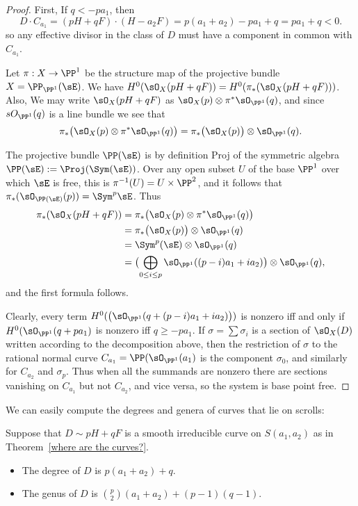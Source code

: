 \begin{proof} First, If $q<-pa_{1}$, then 
$$
D\cdot C_{a_{1}} = (pH+qF) \cdot (H-a_{2}F) = p(a_{1}+a_{2}) -pa_{1}+q = pa_{1}+q < 0.
$$
so any effective divisor in the class of $D$ must have a component in common with $C_{a_{1}}$.

Let $\pi:X\to \PP^{1}$ be the structure map of the projective bundle $X = \PP_{\PP^{1}}(\sE)$.
We have $H^{0}(\sO_{X}(pH+qF)) = H^{0}(\pi_{*}(\sO_{X}(pH+qF)))$. Also, 
We may write $\sO_{X}(pH+qF)$ as $\sO_{X}(p) \otimes \pi^{*}\sO_{\PP^{1}}(q)$, and since
$sO_{\PP^{1}}(q)$ is a line bundle we see that 
$$
\pi_{*}\bigl(\sO_{X}(p) \otimes \pi^{*}\sO_{\PP^{1}}(q)\bigr) 
 = \pi_{*}\bigl(\sO_{X}(p)\bigr)\otimes \sO_{\PP^{1}}(q).
$$

The projective bundle $\PP(\sE)$ is
by definition Proj of the symmetric algebra $\PP(\sE):=\Proj(\Sym(\sE))$. Over any open 
subset $U$ of the base $\PP^1$ over which $\sE$ is free, this is $\pi^{-1}(U) = U\times \PP^2$,
and it follows that $\pi_*(\sO_{\PP(\sE)}(p)) = \Sym^p\sE$. 
Thus 
\begin{align*}
\pi_{*}(\sO_{X}(pH+qF)) &= 
\pi_{*}\bigl(\sO_{X}(p) \otimes \pi^{*}\sO_{\PP^{1}}(q)\bigr) \\
 &= \pi_{*}\bigl(\sO_{X}(p)\bigr)\otimes \sO_{\PP^{1}}(q)\\
&=  \Sym^{p}(\sE)\otimes \sO_{\PP^{1}}(q)\\
&=  \bigl(\bigoplus_{0\leq i\leq p} \sO_{\PP^{1}}((p-i)a_{1}+i a_{2})\bigr) \otimes \sO_{\PP^{1}}(q),
\end{align*}
and the first formula follows. 

Clearly, every term 
$H^{0}(\bigl(\sO_{\PP^{1}}(q + (p-i)a_{1}+i a_{2})\bigr))$ is nonzero iff and only if 
$H^{0}(\sO_{\PP^{1}}(q + pa_{1})$ is nonzero iff $q\geq -pa_{1}$.
If $\sigma = \sum \sigma_i$ is a section of $\sO_X(D)$ written according to the decomposition
above, then the restriction of $\sigma$ to  the rational normal curve $C_{a_1} = \PP(\sO_{\PP^1}(a_1)$ is the component $\sigma_0$, and similarly for $C_{a_2}$ and $\sigma_p$. Thus when  all the summands are nonzero
there are sections  vanishing on $C_{a_{1}}$ but not $C_{a_{2}}$, and vice versa, so the system is base point free. 
\end{proof}

 
We can easily compute the degrees and genera of curves that lie on scrolls:

\begin{proposition}
 Suppose that $D\sim pH+qF$ is a smooth irreducible curve on $S(a_{1}, a_{2})$ as in Theorem~\ref{where are the curves?}. 
\begin{itemize}
 \item The degree of $D$ is $p(a_{1}+a_{2}) +q$.
 \item The genus of $D$ is ${p\choose 2}(a_{1}+a_{2}) + (p-1)(q-1)$.
\end{itemize}
\end{proposition}
  
